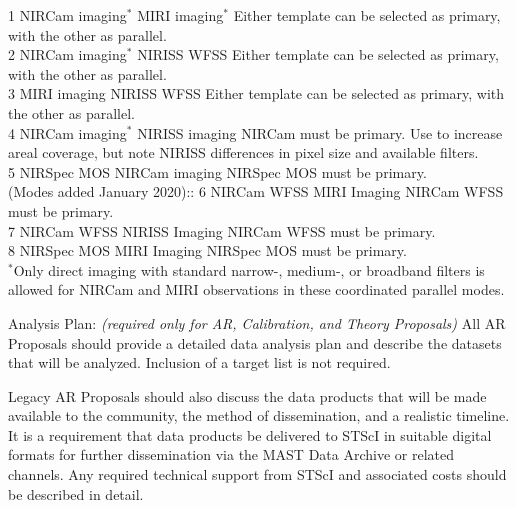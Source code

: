 \documentclass[12pt]{article}
\begin{document}
1	NIRCam imaging$^{*}$ MIRI imaging$^{*}$ Either template can be selected as primary, with the other as parallel. \\
2	NIRCam imaging$^{*}$	NIRISS WFSS	Either template can be selected as primary, with the other as parallel. \\ 
3	MIRI imaging	NIRISS WFSS	Either template can be selected as primary, with the other as parallel. \\
4	NIRCam imaging$^{*}$ NIRISS imaging	NIRCam must be primary. Use to increase areal coverage, but note NIRISS differences in pixel size and available filters. \\
5	NIRSpec MOS	NIRCam imaging	NIRSpec MOS must be primary.\\
(Modes added January 2020)::	
6	NIRCam WFSS	MIRI Imaging	NIRCam WFSS must be primary. \\
7	NIRCam WFSS	NIRISS Imaging	NIRCam WFSS must be primary.\\
8	NIRSpec MOS	MIRI Imaging	NIRSpec MOS must be primary. \\

$^{*}$Only direct imaging with standard narrow-, medium-, or broadband filters is allowed for NIRCam and MIRI observations in these coordinated parallel modes.



%
%
\duplications           %





%
%
\analysisplan %

Analysis Plan:  {\it (required only for AR, Calibration, and Theory Proposals)} All AR Proposals should provide a detailed data analysis plan and describe the datasets that will be analyzed. Inclusion of a target list is not required.

\smallskip
\smallskip
\noindent
Legacy AR Proposals should also discuss the data products that will be made available to the community, the method of dissemination, and a realistic timeline. It is a requirement that data products be delivered to STScI in suitable digital formats for further dissemination via the MAST Data Archive or related channels. Any required technical support from STScI and associated costs should be described in detail.
\end{document}
